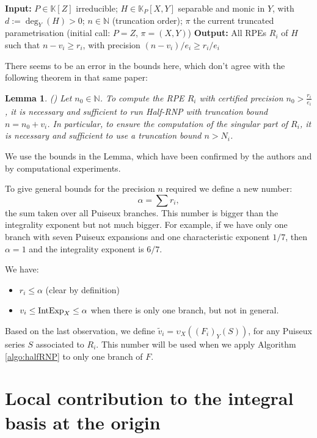 \documentclass[a4paper,11pt,reqno]{amsart}%
\theoremstyle{definition}
\theoremstyle{plain}
\newtheorem{lemma}[defn]{Lemma}
\theoremstyle{remark}
\newcommand\ct[1]{\text{\rmfamily\upshape #1}}
\newcommand{\IntExpX}{\ct{IntExp}_X}
\begin{document}
\begin{algorithm}[H]
\caption{Half-RNP($H, P, n, \pi$)}
\label{algo:halfRNP}
\begin{algorithmic}[1]
\State \textbf{Input:} $P \in \mathbb{K}[Z]$ irreducible;
$H \in \mathbb{K}_P[X, Y]$ separable and monic in $Y$, with $d := \deg_Y(H) > 0$;
$n \in \mathbb{N}$ (truncation order); $\pi$ the current truncated parametrisation (initial call: $P = Z$, $\pi = (X, Y)$)
\State \textbf{Output:} All RPEs $R_i$ of $H$ such that $n - v_i \ge r_i$, with precision $(n - v_i)/e_i \ge r_i/e_i$
\end{algorithmic}
\end{algorithm}

There seems to be an error in the bounds here, which don't agree with the following theorem in that same paper:

\begin{lemma}(\cite[Lemma 3.19]{poteaux2021})
Let $n_0 \in \mathbb{N}$. To compute the RPE $R_i$ with certified precision
$n_0 > \frac{r_i}{e_i}$, it is necessary and sufficient to run \emph{Half-RNP}
with truncation bound $n = n_0 + v_i$. In particular, to ensure the computation
of the singular part of $R_i$, it is necessary and sufficient to use a truncation
bound $n > N_i$.
\end{lemma}

We use the bounds in the Lemma, which have been confirmed by the authors and by computational experiments.

To give general bounds for the precision $n$ required we define a new number:
$$
\alpha = \sum r_i,
$$
the sum taken over all Puiseux branches. This number is bigger than the integrality exponent but not much bigger.
For example, if we have only one branch with seven Puiseux expansions and one characteristic exponent $1/7$, then $\alpha = 1$ and the integrality exponent is $6/7$.

We have:
\begin{itemize}
\item $r_i \le \alpha$ (clear by definition)
\item $v_i \le \IntExpX \le \alpha$ when there is only one branch, but not in general.
\end{itemize}

Based on the last observation, we define $\tilde v_i = \upsilon_X((F_i)_Y(S))$, for any Puiseux series \( S \) associated to \( R_i \). This number will be used when we apply Algorithm \ref{algo:halfRNP} to only one branch of $F$.

\section{Local contribution to the integral basis at the origin}
\end{document}
